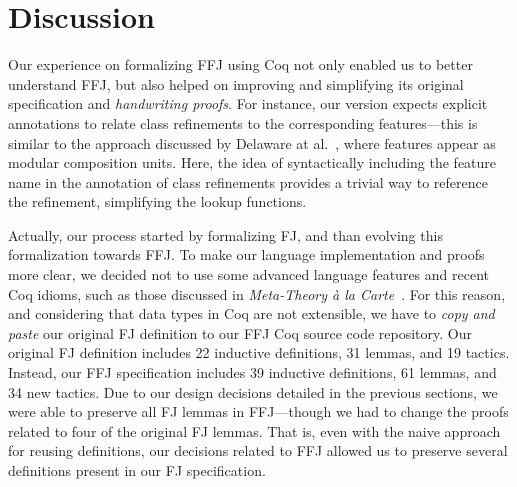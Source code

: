 \section{Discussion}\label{seq:impl}

Our experience on formalizing \ac{FFJ} 
using Coq not only enabled us to better understand \ac{FFJ}, 
but also helped on improving and simplifying its original specification 
and \emph{handwriting proofs}. For instance, our version expects 
explicit annotations to relate class refinements to the 
corresponding features---this is similar to the 
approach discussed by Delaware at al.~\cite{delaware:fse-2009}, 
where features appear as modular composition units. 
Here, the idea of syntactically including the feature name in the annotation 
of class refinements provides a trivial way to 
reference the refinement, simplifying the lookup functions.

Actually, our process started by formalizing \ac{FJ}, %
and than evolving this formalization towards \ac{FFJ}. 
To make our language implementation and proofs more clear, 
we decided not to use some advanced language features 
and recent Coq idioms, such as those discussed in \emph{Meta-Theory \`{a} la Carte}~\cite{}. %
For this reason, and considering that data types in Coq are not extensible, 
we have to \emph{copy and paste} our original \ac{FJ} definition 
to our \ac{FFJ} Coq source code repository. Our original \ac{FJ} 
definition includes 22 inductive definitions, 31 lemmas, and 
19 tactics. Instead, our \ac{FFJ} specification includes 
39 inductive definitions, 61 lemmas, and 34 new tactics. Due to our 
design decisions detailed in the previous sections, 
we were able to preserve all \ac{FJ} lemmas in \ac{FFJ}---though 
we had to change the proofs related to four of the original \ac{FJ} 
lemmas. That is, even with the naive approach for reusing 
definitions, our decisions related to \ac{FFJ} 
allowed us to preserve several definitions present 
in our \ac{FJ} specification. 

